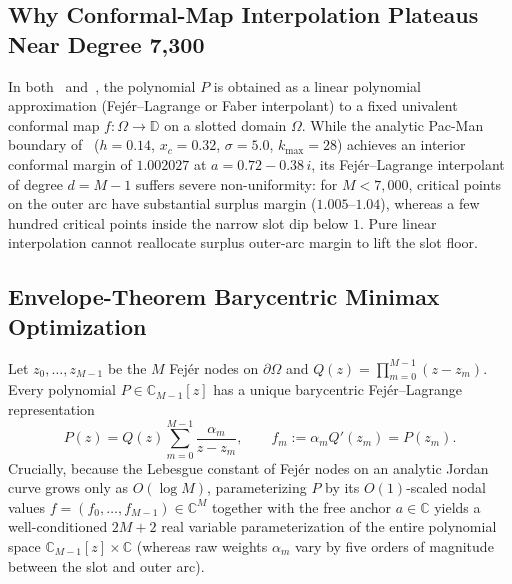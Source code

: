 \documentclass[11pt,a4paper]{amsart}
\theoremstyle{remark}
\newcommand{\C}{\mathbb{C}}
\begin{document}
\subsection{Why Conformal-Map Interpolation Plateaus Near Degree 7,300}
In both~\cite{AC26} and~\cite{Besevic7299}, the polynomial $P$ is obtained as a
linear polynomial approximation (Fej\'er--Lagrange or Faber interpolant) to a
fixed univalent conformal map $f : \Omega \to \mathbb{D}$ on a slotted domain
$\Omega$. While the analytic Pac-Man boundary of~\cite{Besevic7299}
($h = 0.14$, $x_c = 0.32$, $\sigma = 5.0$, $k_{\max} = 28$) achieves an interior
conformal margin of $1.002027$ at $a = 0.72 - 0.38\,i$, its Fej\'er--Lagrange
interpolant of degree $d = M - 1$ suffers severe non-uniformity: for
$M < 7{,}000$, critical points on the outer arc have substantial surplus margin
($1.005$--$1.04$), whereas a few hundred critical points inside the narrow slot
dip below $1$. Pure linear interpolation cannot reallocate surplus outer-arc
margin to lift the slot floor.

\subsection{Envelope-Theorem Barycentric Minimax Optimization}
Let $z_0, \dots, z_{M-1}$ be the $M$ Fej\'er nodes on $\partial\Omega$ and
$Q(z) = \prod_{m=0}^{M-1} (z - z_m)$. Every polynomial $P \in \C_{M-1}[z]$ has a
unique barycentric Fej\'er--Lagrange representation
\[
  P(z) = Q(z)\sum_{m=0}^{M-1} \frac{\alpha_m}{z - z_m},
  \qquad f_m := \alpha_m Q'(z_m) = P(z_m).
\]
Crucially, because the Lebesgue constant of Fej\'er nodes on an analytic Jordan
curve grows only as $O(\log M)$, parameterizing $P$ by its $O(1)$-scaled nodal
values $f = (f_0, \dots, f_{M-1}) \in \C^M$ together with the free anchor
$a \in \C$ yields a well-conditioned $2M + 2$ real variable parameterization of
the entire polynomial space $\C_{M-1}[z] \times \C$ (whereas raw weights
$\alpha_m$ vary by five orders of magnitude between the slot and outer arc).
\end{document}
